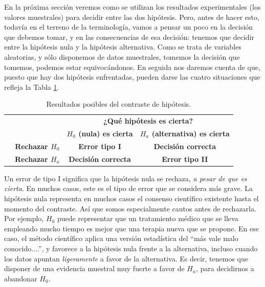 En la próxima sección veremos como se utilizan los resultados experimentales (los valores muestrales) para decidir entre las dos hipótesis. Pero, antes de hacer esto, todavía en el terreno de la terminología, vamos a pensar un poco en la decisión que debemos tomar, y en las consecuencias de esa decisión: tenemos que decidir entre la hipótesis nula y la hipótesis alternativa. Como se trata de variables aleatorias, y sólo disponemos de datos muestrales, tomemos la decisión que tomemos, podemos estar equivocándonos. En seguida nos daremos cuenta de que, puesto que hay dos hipótesis enfrentadas, pueden darse las cuatro situaciones que refleja la Tabla \ref{cap07:tabla:ResultadosPosiblesContrasteHipotesis}.

\begin{table}[htbp]
    \begin{center}
    \begin{tabular}{cccc}
    \cline{3-4}
    &&\multicolumn{2}{|c|}{\bf ¿Qué hipótesis es cierta?}\\[3mm]
    \cline{3-4}
                                                  &&\multicolumn{1}{|c|}{\bf $H_0$ (nula) es cierta}&\multicolumn{1}{|c|}{\bf $H_a$ (alternativa) es cierta}\\[3mm]
    \cline{2-4}
                                    &\multicolumn{1}{|c|}{\bf Rechazar $H_0$}&\multicolumn{1}{|c|}{\bf Error tipo I}&\multicolumn{1}{|c|}{\bf Decisión correcta}\\[3mm]
    \cline{2-4}
                                    &\multicolumn{1}{|c|}{\bf Rechazar $H_a$}&\multicolumn{1}{|c|}{\bf Decisión correcta}&\multicolumn{1}{|c|}{\bf Error tipo II}\\[3mm]
    \cline{2-4}
    \end{tabular}
    \end{center}
    \caption{Resultados posibles del contraste de hipótesis.}
    \label{cap07:tabla:ResultadosPosiblesContrasteHipotesis}
\end{table}

Un {\sf error de tipo I} significa que la hipótesis nula se rechaza, {\em a pesar de que es cierta}. En  muchos casos, este es el tipo de error que se considera más grave. La hipótesis nula representa en muchos casos el consenso científico existente hasta el momento del contraste. Así que somos especialmente cautos antes de rechazarla. Por ejemplo, $H_0$ puede representar que un tratamiento médico que se lleva empleando mucho tiempo es mejor que una terapia nueva que se propone. En ese caso, el método científico aplica una versión estadística del ``más vale malo conocido....'', y favorece a la hipótesis nula frente a la alternativa, incluso cuando los datos apuntan {\em ligeramente} a favor de la alternativa. Es decir, tenemos que disponer de una evidencia muestral muy fuerte a favor de $H_a$, para decidirnos a abandonar $H_0$.

